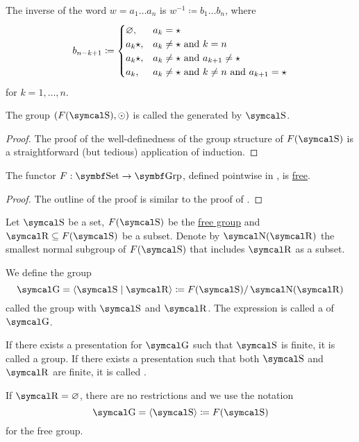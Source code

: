 \begin{definition}
  The inverse of the word \( w = a_1 \ldots a_n \) is \( w^{-1} \coloneqq b_1 \ldots b_n \), where
   \begin{equation}\label{eq:def:free_group/inverse}
     b_{n-k+1} \coloneqq \begin{cases}
       \varnothing, &a_k = {\star} \\
       a_k{\star},  &a_k \neq {\star} \text{ and } k = n \\
       a_k{\star},  &a_k \neq {\star} \text{ and } a_{k+1} \neq {\star} \\
       a_k,         &a_k \neq {\star} \text{ and } k \neq n \text{ and } a_{k+1} = {\star} \\
     \end{cases}
   \end{equation}
   for \( k = 1, \ldots, n \).

  The group \( (F(\CS), \odot) \) is called the  generated by \( \CS \).
\end{definition}
\begin{proof}
  The proof of the well-definedness of the group structure of \( F(\CS) \) is a straightforward (but tedious) application of induction\IND.
\end{proof}

\begin{proposition}\label{thm:free_group_is_free_functor}
  The functor \( F: \Cat{Set} \to \Cat{Grp} \), defined pointwise in , is \hyperref[def:free_functor]{free}.
\end{proposition}
\begin{proof}
  The outline of the proof is similar to the proof of .
\end{proof}

\begin{definition}\label{def:group_presentation}
  Let \( \CS \) be a set, \( F(\CS) \) be the \hyperref[def:free_group]{free group} and \( \CR \subseteq F(\CS) \) be a subset. Denote by \( \CN(\CR) \) the smallest normal subgroup of \( F(\CS) \) that includes \( \CR \) as a subset.

  We define the group
  \begin{equation}\label{eq:def:group_presentation/presentation}
    \CG = \Gen{ \CS \mid \CR} \coloneqq F(\CS) / \CN(\CR)
  \end{equation}
  called the group with  \( \CS \) and  \( \CR \). The expression  is called a  of \( \CG \).

  If there exists a presentation for \( \CG \) such that \( \CS \) is finite, it is called a  group. If there exists a presentation such that both \( \CS \) and \( \CR \) are finite, it is called .

  If \( \CR = \varnothing \), there are no restrictions and we use the notation
  \begin{equation}\label{eq:def:group_presentation/free}
    \CG = \Gen{ \CS } \coloneqq F(\CS)
  \end{equation}
  for the free group.
\end{definition}

